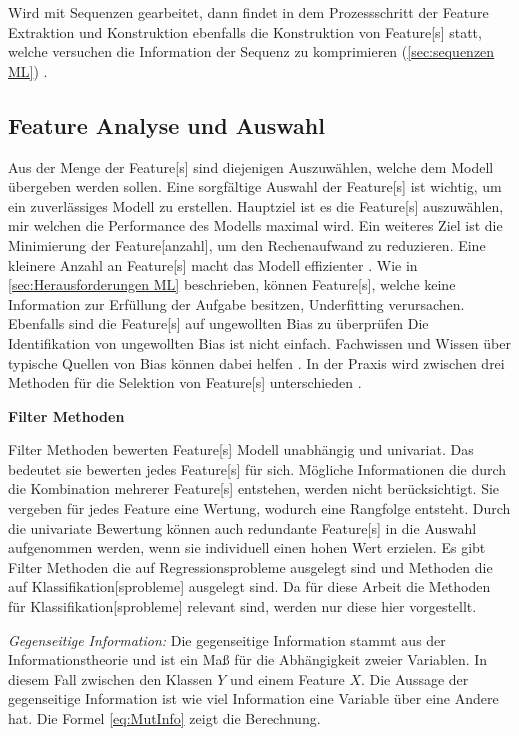 Wird mit Sequenzen gearbeitet, dann findet in dem Prozessschritt der \gls{Feature} Extraktion und Konstruktion ebenfalls die Konstruktion von \gls{Feature}[s] statt, welche versuchen die Information der Sequenz zu komprimieren (\ref{sec:sequenzen ML}) \cite{Nielsen.2020}. 

\subsection{Feature Analyse und Auswahl} \label{sec:ML FeatSelect}
Aus der Menge der \gls{Feature}[s] sind diejenigen Auszuwählen, welche dem Modell übergeben werden sollen. Eine sorgfältige Auswahl der \gls{Feature}[s] ist wichtig, um ein zuverlässiges Modell zu erstellen. Hauptziel ist es die \gls{Feature}[s] auszuwählen, mir welchen die Performance des Modells maximal wird. Ein weiteres Ziel ist die Minimierung der \gls{Feature}[anzahl], um den Rechenaufwand zu reduzieren. Eine kleinere Anzahl an \gls{Feature}[s] macht das Modell effizienter \cite{Kuhn.2013, Guyon.2003}. Wie in \ref{sec:Herausforderungen ML} beschrieben, können \gls{Feature}[s], welche keine Information zur Erfüllung der Aufgabe besitzen, \gls{Underfitting} verursachen. Ebenfalls sind die \gls{Feature}[s] auf ungewollten \gls{Bias} zu überprüfen Die Identifikation von ungewollten \gls{Bias} ist nicht einfach. Fachwissen und Wissen über typische Quellen von \gls{Bias} können dabei helfen \cite{Mehrabi.2019, Nielsen.2020}. In der Praxis wird zwischen drei Methoden für die Selektion von \gls{Feature}[s] unterschieden \cite{Guyon.2003}. \dubpar

\textbf{\gls{Filter Methoden}}\par
\gls{Filter Methoden} bewerten \gls{Feature}[s] Modell unabhängig und univariat. Das bedeutet sie bewerten jedes \gls{Feature}[s] für sich. Mögliche Informationen die durch die Kombination mehrerer \gls{Feature}[s] entstehen, werden nicht berücksichtigt. Sie vergeben für jedes \gls{Feature} eine Wertung, wodurch eine Rangfolge entsteht. Durch die univariate Bewertung können auch redundante \gls{Feature}[s] in die Auswahl aufgenommen werden, wenn sie individuell einen hohen Wert erzielen. Es gibt \gls{Filter Methoden} die auf Regressionsprobleme ausgelegt sind und Methoden die auf \gls{Klassifikation}[sprobleme] ausgelegt sind. Da für diese Arbeit die Methoden für \gls{Klassifikation}[sprobleme] relevant sind, werden nur diese hier vorgestellt.\par

\textit{Gegenseitige Information:} Die gegenseitige Information stammt aus der Informationstheorie und ist ein Maß für die Abhängigkeit zweier Variablen. In diesem Fall zwischen den Klassen \(Y\) und einem \gls{Feature} \(X\). Die Aussage der gegenseitige Information ist wie viel Information eine Variable über eine Andere hat. Die Formel \ref{eq:MutInfo} zeigt die Berechnung. 

